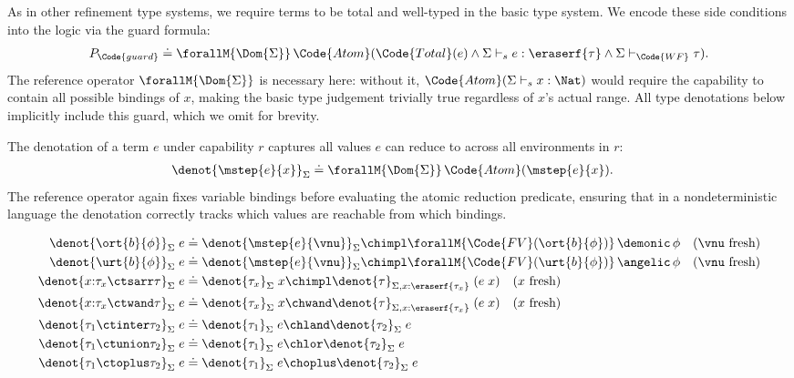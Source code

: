 As in other refinement type systems, we require terms to be total and
well-typed in the basic type system.  We encode these side conditions
into the logic via the guard formula:
\begin{align*}
  P_{\Code{guard}} \doteq \forallM{\Dom{\Sigma}}\,\Code{Atom}(\Code{Total}(e) \land \Sigma \vdash_s e : \eraserf{\tau} \land \Sigma \vdash_{\Code{WF}} \tau).
\end{align*}
The reference operator $\forallM{\Dom{\Sigma}}$ is necessary here:
without it, $\Code{Atom}(\Sigma \vdash_s x : \Nat)$ would require the
capability to contain all possible bindings of $x$, making the basic
type judgement trivially true regardless of $x$'s actual range.  All
type denotations below implicitly include this guard, which we omit for
brevity.

The denotation of a term $e$ under capability $r$ captures all values
$e$ can reduce to across all environments in $r$:
\begin{align*}
  \denot{\mstep{e}{x}}_\Sigma &\doteq \forallM{\Dom{\Sigma}}\,\Code{Atom}(\mstep{e}{x}).
\end{align*}
The reference operator again fixes variable bindings before evaluating
the atomic reduction predicate, ensuring that in a nondeterministic
language the denotation correctly tracks which values are reachable
from which bindings.

\begin{definition}\label{def:type-denotation}
  \begin{align*}
    \denot{\ort{b}{\phi}}_\Sigma\;e &\doteq \denot{\mstep{e}{\vnu}}_\Sigma \chimpl \forallM{\Code{FV}(\ort{b}{\phi})}\,\demonic\,\phi \quad \text{($\vnu$ fresh)}
    \\\denot{\urt{b}{\phi}}_\Sigma\;e &\doteq \denot{\mstep{e}{\vnu}}_\Sigma \chimpl \forallM{\Code{FV}(\urt{b}{\phi})}\,\angelic\,\phi \quad \text{($\vnu$ fresh)}
    \\\denot{x{:}\tau_x \ctsarr \tau}_\Sigma\;e &\doteq \denot{\tau_x}_\Sigma\;x \chimpl \denot{\tau}_{\Sigma,x{:}\eraserf{\tau_x}}\;(e\;x) \quad \text{($x$ fresh)}
    \\\denot{x{:}\tau_x \ctwand \tau}_\Sigma\;e &\doteq \denot{\tau_x}_\Sigma\;x \chwand \denot{\tau}_{\Sigma,x{:}\eraserf{\tau_x}}\;(e\;x) \quad \text{($x$ fresh)}
    \\\denot{\tau_1 \ctinter \tau_2}_\Sigma\;e &\doteq \denot{\tau_1}_\Sigma\;e \chland \denot{\tau_2}_\Sigma\;e
    \\\denot{\tau_1 \ctunion \tau_2}_\Sigma\;e &\doteq \denot{\tau_1}_\Sigma\;e \chlor \denot{\tau_2}_\Sigma\;e
    \\\denot{\tau_1 \ctoplus \tau_2}_\Sigma\;e &\doteq \denot{\tau_1}_\Sigma\;e \choplus \denot{\tau_2}_\Sigma\;e
  \end{align*}
\end{definition}

